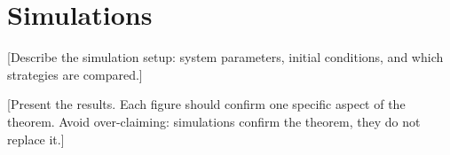 \section{Simulations}\label{sec:sim}

[Describe the simulation setup: system parameters, initial conditions,
and which strategies are compared.]

[Present the results. Each figure should confirm one specific aspect of
the theorem. Avoid over-claiming: simulations confirm the theorem,
they do not replace it.]

